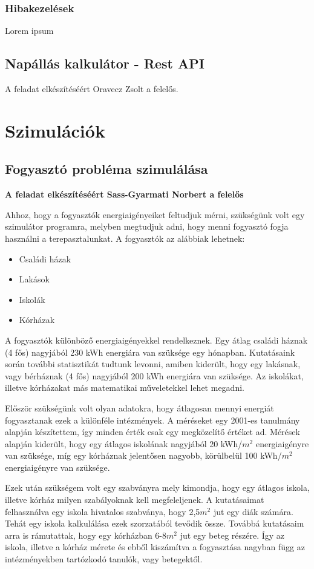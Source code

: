 \documentclass[
]{thesis-ekf}
\theoremstyle{definition}
\theoremstyle{remark}
\begin{document}
			\subsubsection{Hibakezelések}
				Lorem ipsum
		\subsection{Napállás kalkulátor - Rest API}
			A feladat elkészítéséért Oravecz Zsolt a felelős. 
	\section{Szimulációk}
		\subsection{Fogyasztó probléma szimulálása} \label{fogyaszto}
			\par \textbf{A feladat elkészítéséért Sass-Gyarmati Norbert a felelős}
			\par Ahhoz, hogy a fogyasztók energiaigényeiket feltudjuk mérni, szükségünk volt egy szimulátor programra, melyben megtudjuk adni, hogy menni fogyasztó fogja használni a terepasztalunkat. A fogyasztók az alábbiak lehetnek:
			\begin{itemize}
				\item Családi házak
				\item Lakások
				\item Iskolák
				\item Kórházak
			\end{itemize}
			\par A fogyasztók különböző energiaigényekkel rendelkeznek. Egy átlag családi háznak (4 fős) nagyjából 230 kWh energiára van szüksége egy hónapban. Kutatásaink során további statisztikát tudtunk levonni, amiben kiderült, hogy egy lakásnak, vagy bérháznak (4 fős) nagyjából 200 kWh energiára van szüksége\cite{kWh}. Az iskolákat, illetve kórházakat más matematikai műveletekkel lehet megadni. 
			\par Először szükségünk volt olyan adatokra, hogy átlagosan mennyi energiát fogyasztanak ezek a különféle intézmények. A méréseket egy 2001-es tanulmány alapján készítettem, így minden érték csak egy megközelítő értéket ad. Mérések alapján kiderült, hogy egy átlagos iskolának nagyjából 20 kWh/$m^{2}$ energiaigényre van szüksége, míg egy kórháznak jelentősen nagyobb, körülbelül 100 kWh/$m^{2}$ energiaigényre van szüksége\cite{school}. 
			\par Ezek után szükségem volt egy szabványra mely kimondja, hogy egy átlagos iskola, illetve kórház milyen szabályoknak kell megfeleljenek. A kutatásaimat felhasználva egy iskola hivatalos szabványa, hogy 2,5$m^{2}$ jut egy diák számára\cite{school_m2}. Tehát egy iskola kalkulálása ezek szorzatából tevődik össze. Továbbá kutatásaim arra is rámutattak, hogy egy kórházban 6-8$m^{2}$ jut egy beteg részére. Így az iskola, illetve a kórház mérete és ebből kiszámítva a fogyasztása nagyban függ az intézményekben tartózkodó tanulók, vagy betegektől.
\end{document}
